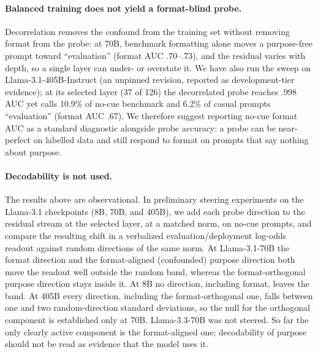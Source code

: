 \paragraph{Balanced training does not yield a format-blind probe.}
Decorrelation removes the confound from the training set without removing
format from the probe: at 70B, benchmark formatting alone moves a purpose-free
prompt toward ``evaluation'' (format AUC .70--.73), and the residual varies
with depth, so a single layer can under- or overstate it. We have also run the
sweep on Llama-3.1-405B-Instruct (an unpinned revision, reported as
development-tier evidence); at its selected layer (37 of 126) the decorrelated
probe reaches .998 AUC yet calls 10.9\% of no-cue benchmark and 6.2\% of casual
prompts ``evaluation'' (format AUC .67). We therefore suggest reporting no-cue
format AUC as a standard diagnostic alongside probe accuracy: a probe can be
near-perfect on labelled data and still respond to format on prompts that say
nothing about purpose.

\paragraph{Decodability is not used.}
The results above are observational. In preliminary steering experiments on
the Llama-3.1 checkpoints (8B, 70B, and 405B), we add each probe direction to
the residual stream at the selected layer, at a matched norm, on no-cue
prompts, and compare the resulting shift in a verbalized evaluation/deployment
log-odds readout against random directions of the same norm. At Llama-3.1-70B
the format direction and the format-aligned (confounded) purpose direction both
move the readout well outside the random band, whereas the format-orthogonal
purpose direction stays inside it. At 8B no direction, including format, leaves
the band. At 405B every direction, including the format-orthogonal one, falls
between one and two random-direction standard deviations, so the null for the
orthogonal component is established only at 70B. Llama-3.3-70B was not steered.
So far the only clearly active component is the format-aligned one;
decodability of purpose should not be read as evidence that the model uses it.

